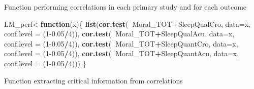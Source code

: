 \documentclass[
]{book}
\newenvironment{Shaded}{\begin{snugshade}}{\end{snugshade}}
\newcommand{\ControlFlowTok}[1]{\textcolor[rgb]{0.13,0.29,0.53}{\textbf{#1}}}
\newcommand{\DataTypeTok}[1]{\textcolor[rgb]{0.13,0.29,0.53}{#1}}
\newcommand{\DecValTok}[1]{\textcolor[rgb]{0.00,0.00,0.81}{#1}}
\newcommand{\FloatTok}[1]{\textcolor[rgb]{0.00,0.00,0.81}{#1}}
\newcommand{\KeywordTok}[1]{\textcolor[rgb]{0.13,0.29,0.53}{\textbf{#1}}}
\newcommand{\NormalTok}[1]{#1}
\newcommand{\OperatorTok}[1]{\textcolor[rgb]{0.81,0.36,0.00}{\textbf{#1}}}
\newcommand{\StringTok}[1]{\textcolor[rgb]{0.31,0.60,0.02}{#1}}
\begin{document}
Function performing correlations in each primary study and for each outcome

\begin{Shaded}
\begin{Highlighting}[]
\NormalTok{LM_perf<-}\ControlFlowTok{function}\NormalTok{(x)\{}
  \KeywordTok{list}\NormalTok{(}\KeywordTok{cor.test}\NormalTok{(}\OperatorTok{~}\NormalTok{Moral_TOT}\OperatorTok{+}\NormalTok{SleepQualCro, }\DataTypeTok{data=}\NormalTok{x,  }\DataTypeTok{conf.level =}\NormalTok{ (}\DecValTok{1}\FloatTok{-0.05}\OperatorTok{/}\DecValTok{4}\NormalTok{)),}
       \KeywordTok{cor.test}\NormalTok{(}\OperatorTok{~}\NormalTok{Moral_TOT}\OperatorTok{+}\NormalTok{SleepQualAcu, }\DataTypeTok{data=}\NormalTok{x,  }\DataTypeTok{conf.level =}\NormalTok{ (}\DecValTok{1}\FloatTok{-0.05}\OperatorTok{/}\DecValTok{4}\NormalTok{)),}
       \KeywordTok{cor.test}\NormalTok{(}\OperatorTok{~}\NormalTok{Moral_TOT}\OperatorTok{+}\NormalTok{SleepQuantCro, }\DataTypeTok{data=}\NormalTok{x,  }\DataTypeTok{conf.level =}\NormalTok{ (}\DecValTok{1}\FloatTok{-0.05}\OperatorTok{/}\DecValTok{4}\NormalTok{)),}
       \KeywordTok{cor.test}\NormalTok{(}\OperatorTok{~}\NormalTok{Moral_TOT}\OperatorTok{+}\NormalTok{SleepQuantAcu, }\DataTypeTok{data=}\NormalTok{x,  }\DataTypeTok{conf.level =}\NormalTok{ (}\DecValTok{1}\FloatTok{-0.05}\OperatorTok{/}\DecValTok{4}\NormalTok{)))}
\NormalTok{\}}
\end{Highlighting}
\end{Shaded}

Function extracting critical information from correlations

\begin{Shaded}
\end{Shaded}
\end{document}
